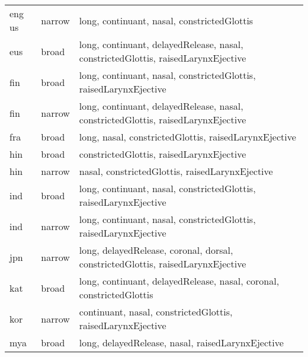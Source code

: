 {\begin{tabularx}{1.2\textwidth}{|llX|}
eng us             & narrow        & long, continuant, nasal, constrictedGlottis                                                                                        \\
eus                & broad         & long, continuant, delayedRelease, nasal, constrictedGlottis, raisedLarynxEjective                                                  \\
fin                & broad         & long, continuant, nasal, constrictedGlottis, raisedLarynxEjective                                                                  \\
fin                & narrow        & long, continuant, delayedRelease, nasal, constrictedGlottis, raisedLarynxEjective                                                  \\
fra                & broad         & long, nasal, constrictedGlottis, raisedLarynxEjective                                                                              \\
hin                & broad         & constrictedGlottis, raisedLarynxEjective                                                                                           \\
hin                & narrow        & nasal, constrictedGlottis, raisedLarynxEjective                                                                                    \\
ind                & broad         & long, continuant, nasal, constrictedGlottis, raisedLarynxEjective                                                                  \\
ind                & narrow        & long, continuant, nasal, constrictedGlottis, raisedLarynxEjective                                                                  \\
jpn                & narrow        & long, delayedRelease, coronal, dorsal, constrictedGlottis, raisedLarynxEjective                                                    \\
kat                & broad    & long, continuant, delayedRelease, nasal, coronal, constrictedGlottis                                                               \\
kor                & narrow        & continuant, nasal, constrictedGlottis, raisedLarynxEjective                                                                        \\
mya                & broad    & long, delayedRelease, nasal, raisedLarynxEjective                                                                                  \\

\end{tabularx}}
